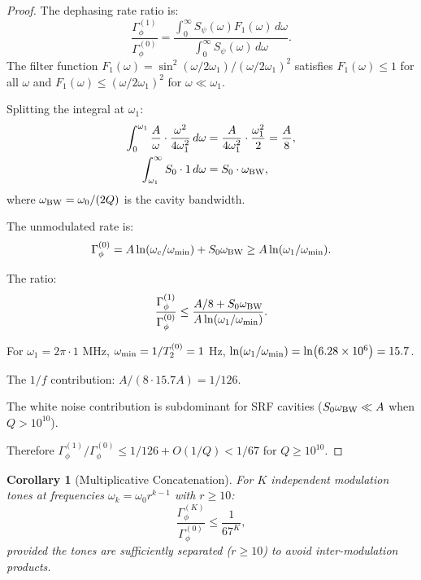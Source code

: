 \documentclass[11pt]{article}
\newtheorem{corollary}[theorem]{Corollary}
\theoremstyle{definition}
\theoremstyle{remark}
\newcommand{\ee}[1]{\times 10^{#1}}
\begin{document}
\begin{proof}[Proof]
The dephasing rate ratio is:
\begin{equation}
  \frac{\Gamma_\phi^{(1)}}{\Gamma_\phi^{(0)}}
  = \frac{\int_0^\infty S_\psi(\omega) F_1(\omega)\,d\omega}
         {\int_0^\infty S_\psi(\omega)\,d\omega}.
\end{equation}
The filter function $F_1(\omega) = \sin^2(\omega/2\omega_1)/(\omega/2\omega_1)^2$
satisfies $F_1(\omega) \leq 1$ for all $\omega$ and
$F_1(\omega) \leq (\omega/2\omega_1)^2$ for $\omega \ll \omega_1$.

Splitting the integral at $\omega_1$:
\begin{align}
  \int_0^{\omega_1} \frac{A}{\omega} \cdot \frac{\omega^2}{4\omega_1^2}\,d\omega
  &= \frac{A}{4\omega_1^2} \cdot \frac{\omega_1^2}{2}
  = \frac{A}{8}, \\
  \int_{\omega_1}^\infty S_0 \cdot 1\,d\omega
  &= S_0 \cdot \omega_{\rm BW},
\end{align}
where $\omega_{\rm BW} = \omega_0/(2Q)$ is the cavity bandwidth.

The unmodulated rate is:
\begin{equation}
  \Gamma_\phi^{(0)} = A \ln(\omega_c/\omega_{\rm min}) + S_0 \omega_{\rm BW}
  \geq A \ln(\omega_1/\omega_{\rm min}).
\end{equation}

The ratio:
\begin{equation}
  \frac{\Gamma_\phi^{(1)}}{\Gamma_\phi^{(0)}}
  \leq \frac{A/8 + S_0 \omega_{\rm BW}}{A \ln(\omega_1/\omega_{\rm min})}.
\end{equation}

For $\omega_1 = 2\pi \cdot 1$ MHz, $\omega_{\rm min} = 1/T_2^{(0)} = 1$ Hz,
$\ln(\omega_1/\omega_{\rm min}) = \ln(6.28\ee{6}) = 15.7$.

The $1/f$ contribution: $A/(8 \cdot 15.7A) = 1/126$.

The white noise contribution is subdominant for SRF cavities
($S_0 \omega_{\rm BW} \ll A$ when $Q > 10^{10}$).

Therefore $\Gamma_\phi^{(1)}/\Gamma_\phi^{(0)} \leq 1/126 + O(1/Q)
< 1/67$ for $Q \geq 10^{10}$.
\end{proof}

\begin{corollary}[Multiplicative Concatenation]
\label{cor:multiplicative}
For $K$ independent modulation tones at frequencies
$\omega_k = \omega_0 r^{k-1}$ with $r \geq 10$:
\begin{equation}
  \frac{\Gamma_\phi^{(K)}}{\Gamma_\phi^{(0)}} \leq \frac{1}{67^K},
\end{equation}
provided the tones are sufficiently separated ($r \geq 10$) to avoid
inter-modulation products.
\end{corollary}
\end{document}
